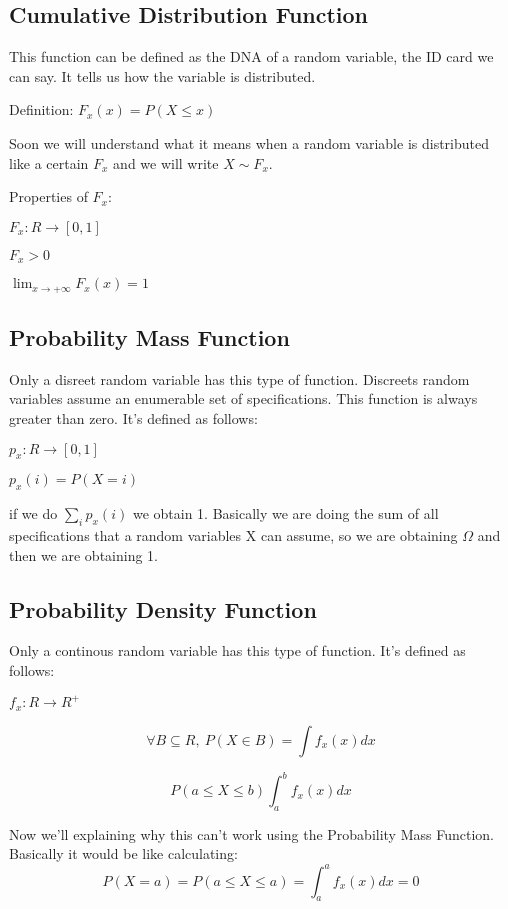 \documentclass{article}
\begin{document}
\subsection{Cumulative Distribution Function}

This function can be defined as the DNA of a random variable, the ID card we can say. It tells us how the variable is distributed.

\bigskip

Definition: $F_x(x) = P(X \leq x)$

Soon we will understand what it means when a random variable is distributed like a certain $F_x$ and we will write $X \sim F_x$. 
\bigskip

Properties of $F_x$:

$F_x : R \rightarrow [0,1]$

$F_x > 0$

$\lim_{x \rightarrow + \infty}F_x(x) = 1$

\subsection{Probability Mass Function}

Only a disreet random variable has this type of function. Discreets random variables assume an enumerable set of specifications. This function is always greater than zero. It's defined as follows:

\bigskip

$p_x : R \rightarrow [0,1]$

$p_x(i) = P(X = i)$

\bigskip

if we do $\sum_{i} p_x(i)$ we obtain 1. Basically we are doing the sum of all specifications that a random variables X can assume, so we are obtaining $\Omega$ and then we are obtaining 1.

\subsection{Probability Density Function}

Only a continous random variable has this type of function. It's defined as follows:

$f_x : R \rightarrow R^+$

\bigskip

$$\forall B \subseteq R, \ P(X \in B) = \int f_x(x)dx$$

$$P(a \leq X \leq b) \int_{a}^{b} f_x(x)dx$$

Now we'll explaining why this can't work using the Probability Mass Function. Basically it would be like calculating: $$P(X = a) = P(a \leq X \leq a) = \int_{a}^{a} f_x(x)dx = 0$$
\end{document}
